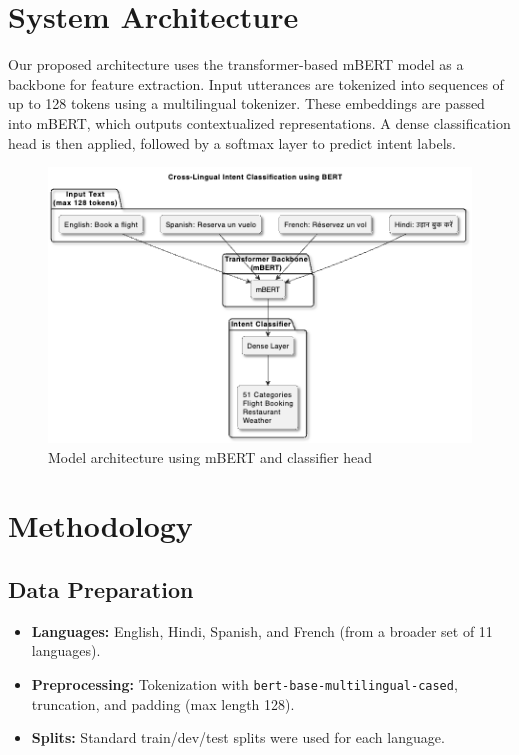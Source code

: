 \documentclass{ecai}
\begin{document}
\section{System Architecture}
Our proposed architecture uses the transformer-based mBERT model as a backbone for feature extraction. Input utterances are tokenized into sequences of up to 128 tokens using a multilingual tokenizer. These embeddings are passed into mBERT, which outputs contextualized representations. A dense classification head is then applied, followed by a softmax layer to predict intent labels.

\begin{figure}[H]
\centering
\includegraphics[width=0.8\linewidth]{architecture.png}
\caption{Model architecture using mBERT and classifier head}
\end{figure}

\section{Methodology}

\subsection{Data Preparation}
\begin{itemize}
    \item \textbf{Languages:} English, Hindi, Spanish, and French (from a broader set of 11 languages).
    \item \textbf{Preprocessing:} Tokenization with \texttt{bert-base-multilingual-cased}, truncation, and padding (max length 128).
    \item \textbf{Splits:} Standard train/dev/test splits were used for each language.
\end{itemize}
\end{document}
